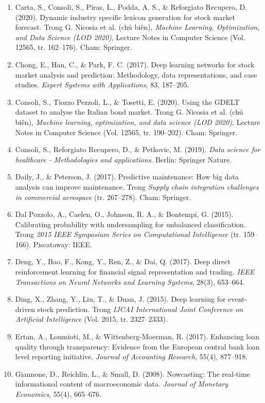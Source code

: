\begin{enumerate}
\item Carta, S., Consoli, S., Piras, L., Podda, A. S., \& Reforgiato Recupero, D. (2020). Dynamic industry specific lexicon generation for stock market forecast. Trong G. Nicosia et al. (chủ biên), \emph{Machine Learning, Optimization, and Data Science (LOD 2020)}, Lecture Notes in Computer Science (Vol. 12565, tr. 162--176). Cham: Springer.
\item Chong, E., Han, C., \& Park, F. C. (2017). Deep learning networks for stock market analysis and prediction: Methodology, data representations, and case studies. \emph{Expert Systems with Applications}, 83, 187--205.
\item Consoli, S., Tiozzo Pezzoli, L., \& Tosetti, E. (2020). Using the GDELT dataset to analyse the Italian bond market. Trong G. Nicosia et al. (chủ biên), \emph{Machine learning, optimization, and data science (LOD 2020)}, Lecture Notes in Computer Science (Vol. 12565, tr. 190--202). Cham: Springer.
\item Consoli, S., Reforgiato Recupero, D., \& Petkovic, M. (2019). \emph{Data science for healthcare - Methodologies and applications}. Berlin: Springer Nature.
\item Daily, J., \& Peterson, J. (2017). Predictive maintenance: How big data analysis can improve maintenance. Trong \emph{Supply chain integration challenges in commercial aerospace} (tr. 267--278). Cham: Springer.
\item Dal Pozzolo, A., Caelen, O., Johnson, R. A., \& Bontempi, G. (2015). Calibrating probability with undersampling for unbalanced classification. Trong \emph{2015 IEEE Symposium Series on Computational Intelligence} (tr. 159--166). Piscataway: IEEE.
\item Deng, Y., Bao, F., Kong, Y., Ren, Z., \& Dai, Q. (2017). Deep direct reinforcement learning for financial signal representation and trading. \emph{IEEE Transactions on Neural Networks and Learning Systems}, 28(3), 653--664.
\item Ding, X., Zhang, Y., Liu, T., \& Duan, J. (2015). Deep learning for event-driven stock prediction. Trong \emph{IJCAI International Joint Conference on Artificial Intelligence} (Vol. 2015, tr. 2327--2333).
\item Ertan, A., Loumioti, M., \& Wittenberg-Moerman, R. (2017). Enhancing loan quality through transparency: Evidence from the European central bank loan level reporting initiative. \emph{Journal of Accounting Research}, 55(4), 877--918.
\item Giannone, D., Reichlin, L., \& Small, D. (2008). Nowcasting: The real-time informational content of macroeconomic data. \emph{Journal of Monetary Economics}, 55(4), 665--676.

\end{enumerate}
